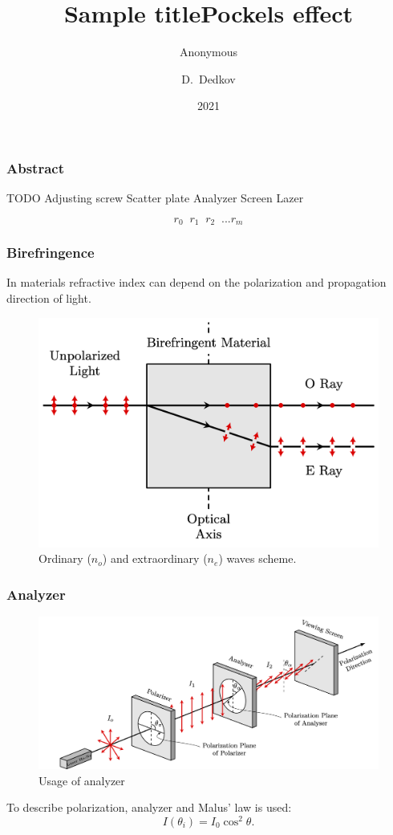 \documentclass{beamer}
\title{Sample title}
\author{Anonymous}
\institute{Overleaf}
\date{2021}
\title[About Beamer] %
{Pockels effect}
\author[Arthur, Doe] %
{D.~Dedkov }
\institute[VFU] %
{
	Moscow Institute of Physics and Technology
}
\date[VLC 2023] %
\begin{document}
	
	\frame{\titlepage}
	
	\begin{frame}
		\frametitle{Abstract}
		TODO
Adjusting screw Scatter plate Analyzer Screen Lazer

$$r_0 \;\; r_1\;\; r_2\;\; ...r_m$$
	\end{frame}
	
	\begin{frame}
		\frametitle{Birefringence}
		\footnotesize
		In materials refractive index can depend on the polarization and propagation direction of light.
		\begin{figure}
			\footnotesize
			\centering
			\includegraphics[width=0.8\linewidth]{res/birefringence}
			\vspace{-5pt}
			\footnotesize
			\caption{\footnotesize Ordinary ($n_o$) and extraordinary ($n_e$) waves scheme.}
		\end{figure}		
	\end{frame}
	
	\begin{frame}
		\frametitle{Analyzer}

		\begin{figure}
			\centering
			\includegraphics[width=1\linewidth]{res/polarizer_analyzer}
			\caption{Usage of analyzer}
		\end{figure}

		To describe polarization, analyzer and Malus' law is used:
		$$
		I(\theta_i) = I_0 \cos^2{\theta}.
		\label{eq:malus}
		$$
	\end{frame}
\end{document}
